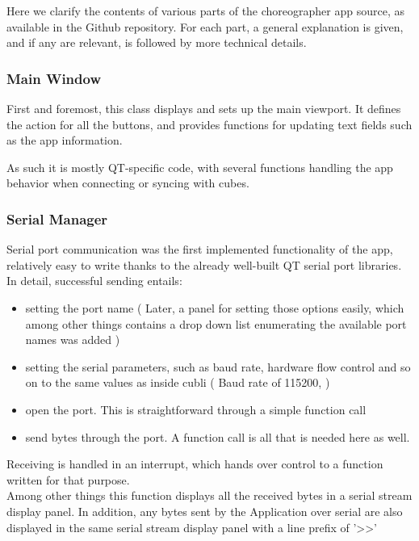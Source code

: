 Here we clarify the contents of various parts of the choreographer app source, as available in the Github repository. For each part, a general explanation is given, and if any are relevant, is followed by more technical details.

\subsubsection{Main Window}

First and foremost, this class displays and sets up the main viewport. It defines the action for all the buttons, and provides functions for updating text fields such as the app information.

As such it is mostly QT-specific code, with several functions handling the app behavior when connecting or syncing with cubes.

\subsubsection{Serial Manager}

Serial port communication was the first implemented functionality of the app, relatively easy to write thanks to the already well-built QT serial port libraries. In detail, successful sending entails: 

\begin{itemize}
\item setting the port name ( Later, a panel for setting those options easily, which among other things contains a drop down list enumerating the available port names was added ) 
\item setting the serial parameters, such as baud rate, hardware flow control and so on to the same values as inside cubli ( Baud rate of 115200, ) 
\item open the port. This is straightforward through a simple function call 
\item send bytes through the port. A function call is all that is needed here as well. 
\end{itemize}

Receiving is handled in an interrupt, which hands over control to a function written for that purpose.\\

Among other things this function displays all the received bytes in a serial stream display panel. In addition, any bytes sent by the Application over serial are also displayed in the same serial stream display panel with a line prefix of '>>' \\

